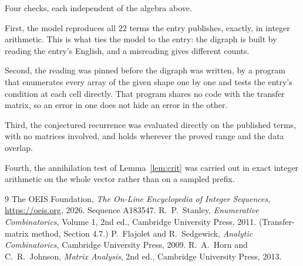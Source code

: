 \documentclass[11pt,a4paper]{article}
\theoremstyle{plain}
\theoremstyle{definition}
\begin{document}
Four checks, each independent of the algebra above.

First, the model reproduces all $22$ terms the entry publishes, exactly, in integer
arithmetic. This is what ties the model to the entry: the digraph is built by reading the
entry's English, and a misreading gives different counts.

Second, the reading was pinned before the digraph was written, by a program that enumerates
every array of the given shape one by one and tests the entry's condition at each cell
directly. That program shares no code with the transfer matrix, so an error in one does not
hide an error in the other.

Third, the conjectured recurrence was evaluated directly on the published terms, with no
matrices involved, and holds wherever the proved range and the data overlap.

Fourth, the annihilation test of Lemma~\ref{lem:crit} was carried out in exact integer
arithmetic on the whole vector rather than on a sampled prefix.

\begin{thebibliography}{9}
 The OEIS Foundation, \emph{The On-Line Encyclopedia of Integer
Sequences}, \url{https://oeis.org}, 2026. Sequence A183547.
 R.~P.~Stanley, \emph{Enumerative Combinatorics}, Volume 1, 2nd ed.,
Cambridge University Press, 2011. (Transfer-matrix method, Section 4.7.)
 P.~Flajolet and R.~Sedgewick, \emph{Analytic Combinatorics}, Cambridge
University Press, 2009.
 R.~A.~Horn and C.~R.~Johnson, \emph{Matrix Analysis}, 2nd ed., Cambridge
University Press, 2013.
\end{thebibliography}
\end{document}
